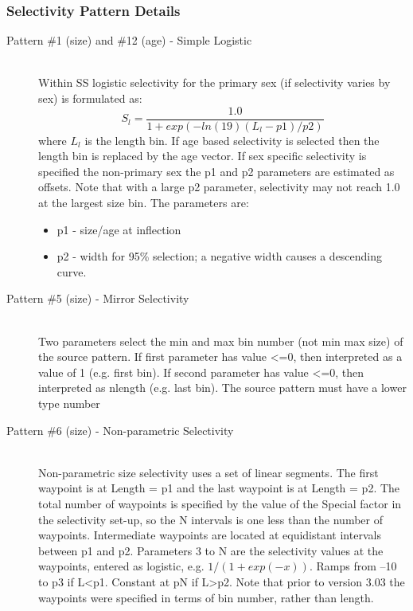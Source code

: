 \subsubsection{Selectivity Pattern Details}
\begin{description}
	\item[Pattern \#1 (size) and \#12 (age) - Simple Logistic]\hfill\\
	Within SS logistic selectivity for the primary sex (if selectivity varies by sex) is formulated as:
	\begin{equation}
	S_l = \frac{1.0}{1+exp(-ln(19)(L_l - p1)/p2)}
	\end{equation}
	where $L_l$ is the length bin.  If age based selectivity is selected then the length bin is replaced by the age vector. If sex specific selectivity is specified the non-primary sex the p1 and p2 parameters are estimated as offsets.  Note that with a large p2 parameter, selectivity may not reach 1.0 at the largest size bin. The parameters are:
		\begin{itemize}
			\item p1 - size/age at inflection
			\item p2 - width for 95\% selection; a negative width causes a descending curve.
		\end{itemize}
\end{description}


\begin{description}
	\item[Pattern \#5 (size) - Mirror Selectivity]\hfil\\
	Two parameters select the min and max bin number (not min max size) of the source pattern.  If first parameter has value <=0, then interpreted as a value of 1 (e.g. first bin).  If second parameter has value <=0, then interpreted as nlength (e.g. last bin). The source pattern must have a lower type number
\end{description}	


\begin{description}
	\item[Pattern \#6 (size) - Non-parametric Selectivity]\hfil\\
	Non-parametric size selectivity uses a set of linear segments.  The first waypoint is at Length = p1 and the last waypoint is at Length = p2.  The total number of waypoints is specified by the value of the Special factor in the selectivity set-up, so the N intervals is one less than the number of waypoints.  Intermediate waypoints are located at equidistant intervals between p1 and p2.  Parameters 3 to N are the selectivity values at the waypoints, entered as logistic, e.g. $1/(1+exp(-x))$.  Ramps from –10 to p3 if L<p1.  Constant at pN if L>p2.  Note that prior to version 3.03 the waypoints were specified in terms of bin number, rather than length.
\end{description}

